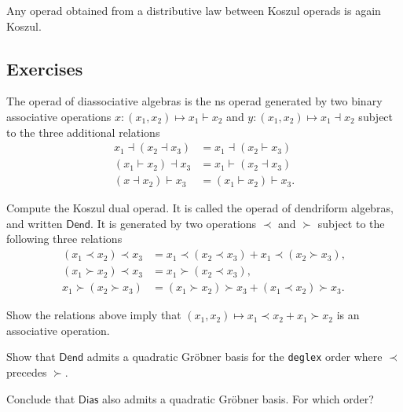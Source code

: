 \begin{theorem}
Any operad obtained from a distributive law
between Koszul operads is again Koszul.
\end{theorem}


\newpage


\subsection{Exercises}

\begin{question}
The operad of diassociative algebras is the
ns operad generated by two binary 
associative operations
$x: (x_1,x_2) \longmapsto x_1\vdash x_2$ and
$y: (x_1,x_2) \longmapsto x_1\dashv x_2$ subject
to the three additional relations
\begin{align*}
 x_1 \dashv (x_2 \dashv x_3) &= x_1 \dashv (x_2 \vdash x_3) \\
 (x_1 \vdash x_2) \dashv x_3 &= x_1 \vdash (x_2 \dashv x_3) \\
(x \dashv x_2) \vdash x_3 &= (x_1 \vdash x_2) \vdash x_3.
\end{align*}
\begin{tenumerate}
\item Compute the Koszul dual operad. It is called the
operad of dendriform algebras, and written $\mathsf{Dend}$. It is generated by two operations
$\prec$ and $\succ$ subject to the following
three relations
\begin{align*}
 (x_1 \prec x_2)  \prec x_3 &= x_1  \prec (x_2  \prec x_3) 
 	+ x_1  \prec (x_2 \succ x_3), \\
 (x_1 \succ x_2)  \prec x_3 &= x_1 \succ (x_2  \prec x_3),\\
 x_1 \succ (x_2 \succ x_3) &=(x_1 \succ x_2) \succ x_3 + (x_1  \prec x_2) \succ x_3.
\end{align*}
\item Show the relations above imply that $(x_1,x_2)\longmapsto x_1\prec x_2+x_1\succ x_2$ is an associative operation.
\item Show that $\mathsf{Dend}$ admits a 
quadratic Gr\"obner basis for the
\texttt{deglex} order where $\prec$ precedes
$\succ$.
\item Conclude that $\mathsf{Dias}$ also admits
a quadratic Gr\"obner basis. For which
order?
\end{tenumerate}
\end{question}

